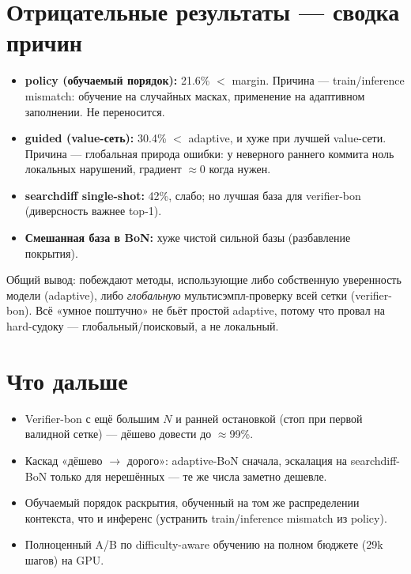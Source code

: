 \documentclass[11pt]{article}
\begin{document}
\section{Отрицательные результаты — сводка причин}

\begin{itemize}
\item \textbf{policy (обучаемый порядок):} 21.6\% $<$ margin. Причина — train/inference mismatch: обучение на
случайных масках, применение на адаптивном заполнении. Не переносится.
\item \textbf{guided (value-сеть):} 30.4\% $<$ adaptive, и хуже при лучшей value-сети. Причина — глобальная
природа ошибки: у неверного раннего коммита ноль локальных нарушений, градиент $\approx$0 когда нужен.
\item \textbf{searchdiff single-shot:} 42\%, слабо; но лучшая база для verifier-bon (диверсность важнее top-1).
\item \textbf{Смешанная база в BoN:} хуже чистой сильной базы (разбавление покрытия).
\end{itemize}

Общий вывод: побеждают методы, использующие либо собственную уверенность модели (adaptive), либо
\emph{глобальную} мультисэмпл-проверку всей сетки (verifier-bon). Всё «умное поштучно» не бьёт простой
adaptive, потому что провал на hard-судоку — глобальный/поисковый, а не локальный.

\section{Что дальше}

\begin{itemize}
\item Verifier-bon с ещё большим $N$ и ранней остановкой (стоп при первой валидной сетке) — дёшево довести до
$\approx$99\%.
\item Каскад «дёшево $\to$ дорого»: adaptive-BoN сначала, эскалация на searchdiff-BoN только для нерешённых —
те же числа заметно дешевле.
\item Обучаемый порядок раскрытия, обученный на том же распределении контекста, что и инференс (устранить
train/inference mismatch из policy).
\item Полноценный A/B по difficulty-aware обучению на полном бюджете (29k шагов) на GPU.
\end{itemize}
\end{document}
